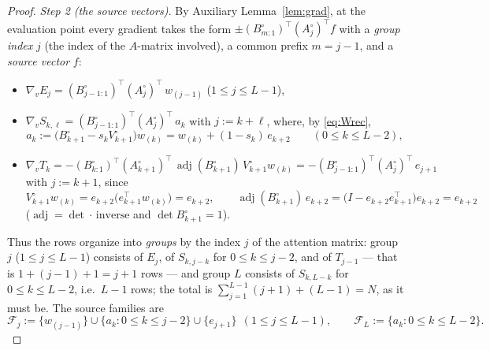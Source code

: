 \documentclass[11pt]{article}
\theoremstyle{definition}
\theoremstyle{remark}
\theoremstyle{plain}
\newcommand{\cF}{\mathcal{F}}
\newcommand{\adj}{\operatorname{adj}}
\begin{document}
\begin{proof}
\emph{Step 2 (the source vectors).}  By Auxiliary Lemma~\ref{lem:grad}, at the
evaluation point every gradient takes the form
$\pm(B^\circ_{m:1})^\top(A^\circ_j)^\top f$ with a \emph{group index} $j$ (the index of
the $A$-matrix involved), a common prefix $m=j-1$, and a \emph{source vector} $f$:
\begin{itemize}
\item $\nabla_vE_j=(B^\circ_{j-1:1})^\top(A^\circ_j)^\top\,w_{(j-1)}$
\hfill($1\le j\le L-1$),
\item $\nabla_vS_{k,\ell}=(B^\circ_{j-1:1})^\top(A^\circ_j)^\top\,a_k$ with
$j:=k+\ell$, where, by \eqref{eq:Wrec},
\begin{equation}\label{eq:Sid}
a_k:=\big(B^\circ_{k+1}-s_kV^\circ_{k+1}\big)w_{(k)}
=w_{(k)}+(1-s_k)\,e_{k+2}\qquad(0\le k\le L-2),
\end{equation}
\item $\nabla_vT_k=-(B^\circ_{k:1})^\top(A^\circ_{k+1})^\top\,
\adj(B^\circ_{k+1})\,V^\circ_{k+1}w_{(k)}
=-(B^\circ_{j-1:1})^\top(A^\circ_j)^\top\,e_{j+1}$ with $j:=k+1$, since
\begin{equation}\label{eq:Tid}
V^\circ_{k+1}w_{(k)}=e_{k+2}\big(e_{k+1}^\top w_{(k)}\big)=e_{k+2},\qquad
\adj(B^\circ_{k+1})\,e_{k+2}
=\big(I-e_{k+2}e_{k+1}^\top\big)e_{k+2}=e_{k+2}
\end{equation}
($\adj=\det\cdot\,\mathrm{inverse}$ and $\det B^\circ_{k+1}=1$).
\end{itemize}
Thus the rows organize into \emph{groups} by the index $j$ of the attention matrix:
group $j$ ($1\le j\le L-1$) consists of $E_j$, of $S_{k,j-k}$ for $0\le k\le j-2$, and
of $T_{j-1}$ --- that is $1+(j-1)+1=j+1$ rows --- and group $L$ consists of
$S_{k,L-k}$ for $0\le k\le L-2$, i.e.\ $L-1$ rows; the total is
$\sum_{j=1}^{L-1}(j+1)+(L-1)=N$, as it must be.  The source families are
\begin{equation}\label{eq:Svec}
\cF_j:=\{w_{(j-1)}\}\cup\{a_k:0\le k\le j-2\}\cup\{e_{j+1}\}\ \ (1\le j\le L-1),
\qquad
\cF_L:=\{a_k:0\le k\le L-2\}.
\end{equation}


\end{proof}
\end{document}
